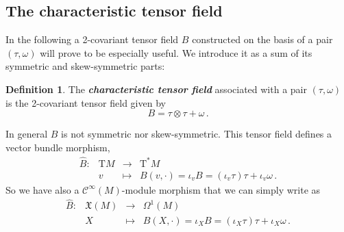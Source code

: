 \documentclass[11pt,twoside]{article}
\theoremstyle{plain}
\theoremstyle{definition}
\newtheorem{definition}[theorem]{Definition}
\newcommand{\Cinfty}{\mathscr{C}^\infty}
\newcommand{\T}{{\mathrm T}}
\let\Tan\T
\newcommand*{\inn}[1]{\iota_{#1}}
\newcommand\dfn[1]{{\textbf{\emph{#1}}}}
\def\Tan{\mathrm{T}}
\def\longto{\longrightarrow}
\begin{document}
\subsection{The characteristic tensor field}

In the following a 2-covariant tensor field $B$ constructed on the basis of a pair $(\tau,\omega)$ will prove to be especially useful.
We introduce it as a sum of its symmetric and skew-symmetric parts:

\begin{definition}
The \dfn{characteristic tensor field} associated
with a pair $(\tau,\omega)$
is the 2-covariant tensor field given by
\begin{equation}
B = \tau \otimes \tau + \omega 
\,.
\end{equation}
\end{definition}

In general $B$ is not symmetric nor skew-symmetric.
This tensor field defines a vector bundle morphism,
$$
\begin{array}{rccl}
\widehat B \colon & \Tan M & \longto & \Tan^*M
\\ 
& v & \longmapsto & B(v,\cdot) = \inn{v}B = (\inn{v}\tau) \tau + \inn{v}\omega\,.
\end{array}
$$
So we have also a $\Cinfty(M)$-module morphism
that we can simply write as
$$
\begin{array}{rccl}
\widehat{B}\colon & \mathfrak{X}(M) & \longto & \Omega^1(M) \\
& X & \longmapsto & B(X,\cdot) = \inn{X}B =(\inn{X} \tau) \tau  +\inn{X} \omega \,.
\end{array}
$$
\end{document}
